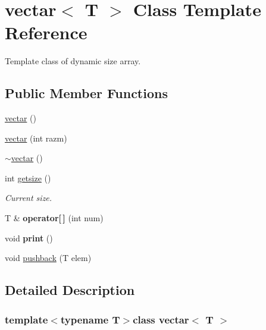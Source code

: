 \hypertarget{classvectar}{\section{vectar$<$ T $>$ Class Template Reference}
\label{classvectar}
}


Template class of dynamic size array.  


\subsection*{Public Member Functions}
\begin{DoxyCompactItemize}
\item 
\hyperlink{classvectar_a593d26acf22ab5c3bd1a0e424a05f010}{vectar} ()
\item 
\hyperlink{classvectar_a1d04ef182d42ae64d0e0e519fdb09d2f}{vectar} (int razm)
\item 
\hyperlink{classvectar_a4c9b7424812904f5fab1bf2c3383207a}{$\sim$vectar} ()
\item 
\hypertarget{classvectar_aca8631ab0e22135e25910c18f83ef465}{int \hyperlink{classvectar_aca8631ab0e22135e25910c18f83ef465}{getsize} ()}\label{classvectar_aca8631ab0e22135e25910c18f83ef465}

\begin{DoxyCompactList}\small\item\em Current size. \end{DoxyCompactList}\item 
\hypertarget{classvectar_abbfede5e58c854b72bc5f7da222fbf87}{T \& {\bfseries operator\mbox{[}$\,$\mbox{]}} (int num)}\label{classvectar_abbfede5e58c854b72bc5f7da222fbf87}

\item 
\hypertarget{classvectar_a31a0c1b147ca45d9d6c153c0bab4797e}{void {\bfseries print} ()}\label{classvectar_a31a0c1b147ca45d9d6c153c0bab4797e}

\item 
void \hyperlink{classvectar_a07c2fe30cd76f5f3f97b88b7268e8d0f}{pushback} (T elem)
\end{DoxyCompactItemize}


\subsection{Detailed Description}
\subsubsection*{template$<$typename T$>$class vectar$<$ T $>$}

